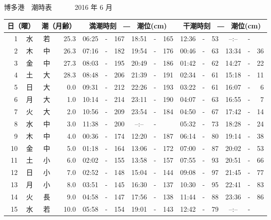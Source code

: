 \documentclass[12pt.a4j]{jsarticle}
\begin{document}
\begin{center}
\begin{table}[ht]
\begin{tabular}{|rc|cr|ccrccr|ccrccr|}
   \hline
   \end{tabular}
\end{table}
\newpage
 {\LARGE 博多港　潮時表　　　}
 {\large 2016 年  6 月}\\
 \begin{table}[ht]
    \begin{tabular}{|rc|cr|ccrccr|ccrccr|}
    \hline
    \multicolumn{2}{|c|}{日（曜）} & \multicolumn{2}{c|}{潮（月齢）} & \multicolumn{6}{c|}{満潮時刻　―　潮位(cm)} & \multicolumn{6}{c|}{干潮時刻　―　潮位(cm)} \\
 \hline
 1 & 水 & 若 & 25.3 &  06:25 &-& 167  &  18:51 &-& 165  &   12:36 &-&  53  &   --:-- &-&     \\
 2 & 木 & 中 & 26.3 &  07:16 &-& 182  &  19:54 &-& 176  &   00:46 &-&  63  &   13:34 &-&  36  \\
 3 & 金 & 中 & 27.3 &  08:03 &-& 195  &  20:49 &-& 186  &   01:42 &-&  62  &   14:27 &-&  22  \\
 4 & 土 & 大 & 28.3 &  08:48 &-& 206  &  21:39 &-& 191  &   02:34 &-&  61  &   15:18 &-&  11  \\
 5 & 日 & 大 &  0.0 &  09:31 &-& 212  &  22:26 &-& 193  &   03:22 &-&  61  &   16:07 &-&   6  \\
 6 & 月 & 大 &  1.0 &  10:14 &-& 214  &  23:11 &-& 190  &   04:07 &-&  63  &   16:55 &-&   7  \\
 7 & 火 & 大 &  2.0 &  10:56 &-& 209  &  23:54 &-& 184  &   04:50 &-&  67  &   17:42 &-&  14  \\
 8 & 水 & 中 &  3.0 &  11:38 &-& 200  &  --:-- &-&     &   05:32 &-&  73  &   18:28 &-&  24  \\
 9 & 木 & 中 &  4.0 &  00:36 &-& 174  &  12:20 &-& 187  &   06:14 &-&  80  &   19:14 &-&  38  \\
10 & 金 & 中 &  5.0 &  01:18 &-& 164  &  13:06 &-& 172  &   07:00 &-&  87  &   20:02 &-&  53  \\
11 & 土 & 小 &  6.0 &  02:02 &-& 155  &  13:58 &-& 157  &   07:55 &-&  93  &   20:51 &-&  66  \\
12 & 日 & 小 &  7.0 &  02:52 &-& 148  &  15:04 &-& 144  &   09:08 &-&  97  &   21:45 &-&  77  \\
13 & 月 & 小 &  8.0 &  03:51 &-& 145  &  16:30 &-& 137  &   10:30 &-&  95  &   22:41 &-&  83  \\
14 & 火 & 長 &  9.0 &  04:58 &-& 147  &  17:56 &-& 138  &   11:44 &-&  88  &   23:36 &-&  86  \\
15 & 水 & 若 & 10.0 &  05:58 &-& 154  &  19:01 &-& 143  &   12:42 &-&  79  &   --:-- &-&     \\

\end{tabular}
\end{table}
\end{center}
\end{document}
